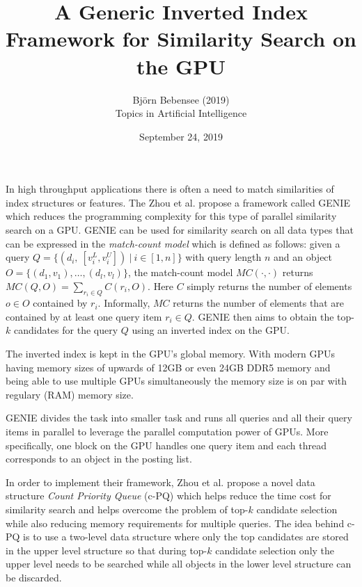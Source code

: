 \documentclass[12pt]{article}
\begin{document}
 
 
\title{A Generic Inverted Index Framework for Similarity Search on the GPU}
\author{Bj\"orn Bebensee (2019)\\ %
Topics in Artificial Intelligence}
\date{September 24, 2019}
\maketitle

\noindent
In high throughput applications there is often a need to match similarities of index structures or features. The Zhou et al. propose a framework called GENIE which reduces the programming complexity for this type of parallel similarity search on a GPU. GENIE can be used for similarity search on all data types that can be expressed in the \emph{match-count model} which is defined as follows: given a query $Q = \{ (d_i, \ [v_i^L, v_i^U]) \ | \ i \in [1,n] \}$ with query length $n$ and an object $O = \{ (d_1,v_1), \ldots, (d_l,v_l) \}$, the match-count model $MC(\cdot,\cdot)$ returns $MC(Q,O) = \sum_{r_i \in Q} C(r_i, O)$. Here $C$ simply returns the number of elements $o \in O$ contained by $r_i$. Informally, $MC$ returns the number of elements that are contained by at least one query item $r_i \in Q$. GENIE then aims to obtain the top-$k$ candidates for the query $Q$ using an inverted index on the GPU.

The inverted index is kept in the GPU's global memory. With modern GPUs having memory sizes of upwards of 12GB or even 24GB DDR5 memory and being able to use multiple GPUs simultaneously the memory size is on par with regulary (RAM) memory size.

GENIE divides the task into smaller task and runs all queries and all their query items in parallel to leverage the parallel computation power of GPUs. More specifically, one block on the GPU handles one query item and each thread corresponds to an object in the posting list.

In order to implement their framework, Zhou et al. propose a novel data structure \emph{Count Priority Queue} (c-PQ) which helps reduce the time cost for similarity search and helps overcome the problem of top-$k$ candidate selection while also reducing memory requirements for multiple queries. The idea behind c-PQ is to use a two-level data structure where only the top candidates are stored in the upper level structure so that during top-$k$ candidate selection only the upper level needs to be searched while all objects in the lower level structure can be discarded.
\end{document}
